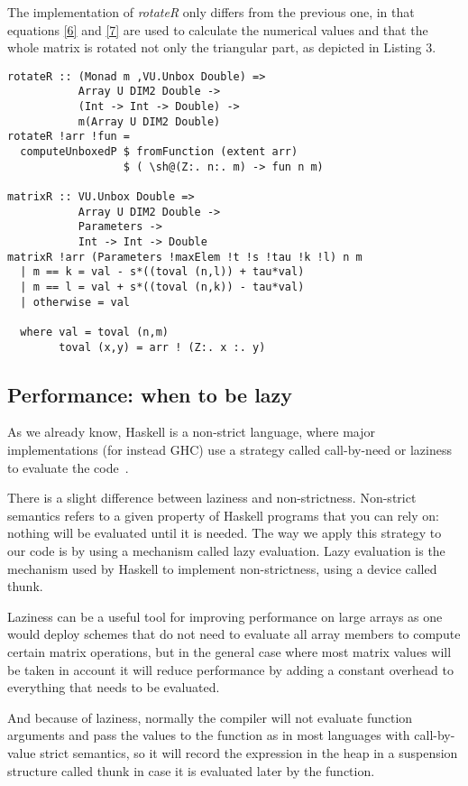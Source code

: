 \documentclass{tmr}
\begin{document}
The implementation of \textit{rotateR} only differs from the previous one, in that
equations \eqref{6} and \eqref{7} are used to calculate the numerical values and
that the whole matrix is rotated not only the triangular part, as depicted in Listing 3.

\begin{lstlisting}[float,captionpos=b,belowcaptionskip=4pt, caption= rotateR function]
rotateR :: (Monad m ,VU.Unbox Double) =>
           Array U DIM2 Double ->
           (Int -> Int -> Double) ->
           m(Array U DIM2 Double)
rotateR !arr !fun =
  computeUnboxedP $ fromFunction (extent arr)
                  $ ( \sh@(Z:. n:. m) -> fun n m)
        
matrixR :: VU.Unbox Double =>
           Array U DIM2 Double ->
           Parameters ->
           Int -> Int -> Double
matrixR !arr (Parameters !maxElem !t !s !tau !k !l) n m
  | m == k = val - s*((toval (n,l)) + tau*val)
  | m == l = val + s*((toval (n,k)) - tau*val)
  | otherwise = val

  where val = toval (n,m)
        toval (x,y) = arr ! (Z:. x :. y)
\end{lstlisting}

\subsection{Performance: when to be lazy}

As we already know, Haskell is a non-strict language, where major implementations (for instead GHC)
use a strategy called call-by-need or laziness to evaluate the code~\cite{Laziness}. 

There is a slight difference between laziness and non-strictness. Non-strict
semantics refers to a given property of Haskell programs that you can rely on: 
nothing will be evaluated until it is needed. The way we apply this strategy to 
our code is by using a mechanism called lazy evaluation. Lazy evaluation is the 
mechanism used by Haskell to implement non-strictness, using a device called thunk. 

Laziness can be a useful tool for improving performance on large arrays as one would deploy
schemes that do not need to evaluate all array members to compute certain matrix operations,
but in the general case where most matrix values will be taken in account it will 
reduce performance by adding a constant overhead to everything that needs to be evaluated.

And because of laziness, normally the compiler will not evaluate function arguments and pass 
the values to the function as in most languages with call-by-value strict semantics, 
so it will record the expression in the heap in a suspension structure called thunk in case it is 
evaluated later by the function. 
\end{document}
